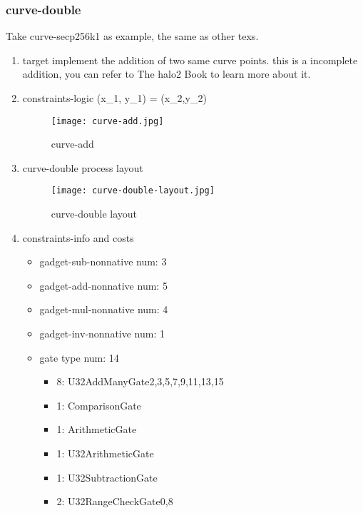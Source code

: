 \subsubsection{curve-double}
\label{curve-double}

Take curve-secp256k1 as example, the same as other texs.

\begin{enumerate}
    \item target
        implement the addition of two same curve points. this is a incomplete addition, you can refer to The halo2 Book \cite{website:halo2-book} to learn more about it.
    \item constraints-logic (x\_1, y\_1) = (x\_2,y\_2)
        \begin{figure}[!ht]
            \centering
            \texttt{[image: curve-add.jpg]}
            \caption{curve-add}
            \label{fig:curve-add}
        \end{figure}
    \item curve-double process layout
        \begin{figure}[!ht]
            \centering
            \texttt{[image: curve-double-layout.jpg]}
            \caption{curve-double layout}
            \label{fig:curve-double-layout}
        \end{figure}
    
    \item constraints-info and costs
        \begin{itemize}
            \item gadget-sub-nonnative num: 3
            \item gadget-add-nonnative num: 5
            \item gadget-mul-nonnative num: 4
            \item gadget-inv-nonnative num: 1
            \item gate type num: 14
                \begin{itemize}
                    \item 8: U32AddManyGate{2,3,5,7,9,11,13,15}
                    \item 1: ComparisonGate
                    \item 1: ArithmeticGate
                    \item 1: U32ArithmeticGate
                    \item 1: U32SubtractionGate
                    \item 2: U32RangeCheckGate{0,8}
                \end{itemize}
        \end{itemize}

\end{enumerate}